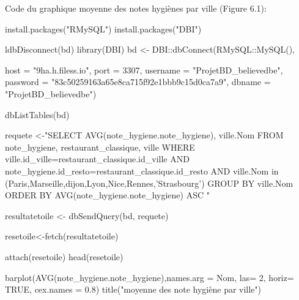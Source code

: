 \documentclass[mstat,12pt]{unswthesis}
\newenvironment{Shaded}{\begin{snugshade}}{\end{snugshade}}
\newcommand{\AttributeTok}[1]{\textcolor[rgb]{0.77,0.63,0.00}{#1}}
\newcommand{\ConstantTok}[1]{\textcolor[rgb]{0.00,0.00,0.00}{#1}}
\newcommand{\DecValTok}[1]{\textcolor[rgb]{0.00,0.00,0.81}{#1}}
\newcommand{\FloatTok}[1]{\textcolor[rgb]{0.00,0.00,0.81}{#1}}
\newcommand{\FunctionTok}[1]{\textcolor[rgb]{0.00,0.00,0.00}{#1}}
\newcommand{\NormalTok}[1]{#1}
\newcommand{\OtherTok}[1]{\textcolor[rgb]{0.56,0.35,0.01}{#1}}
\newcommand{\SpecialCharTok}[1]{\textcolor[rgb]{0.00,0.00,0.00}{#1}}
\newcommand{\StringTok}[1]{\textcolor[rgb]{0.31,0.60,0.02}{#1}}
\begin{document}
\normalsize
\bigskip

Code du graphique moyenne des notes hygiènes par ville (Figure 6.1):
\tiny

\begin{Shaded}
\begin{Highlighting}[]
\FunctionTok{install.packages}\NormalTok{(}\StringTok{"RMySQL"}\NormalTok{)}
\FunctionTok{install.packages}\NormalTok{(}\StringTok{"DBI"}\NormalTok{)}

\FunctionTok{ldbDisconnect}\NormalTok{(bd)}
\FunctionTok{library}\NormalTok{(DBI)}
\NormalTok{bd }\OtherTok{\textless{}{-}}\NormalTok{ DBI}\SpecialCharTok{::}\FunctionTok{dbConnect}\NormalTok{(RMySQL}\SpecialCharTok{::}\FunctionTok{MySQL}\NormalTok{(),}
                     
                     \AttributeTok{host =} \StringTok{"9ha.h.filess.io"}\NormalTok{, }\AttributeTok{port =} \DecValTok{3307}\NormalTok{,}
                     \AttributeTok{username =} \StringTok{"ProjetBD\_believedbe"}\NormalTok{,}
                     \AttributeTok{password =} \StringTok{"83c50259163a65e8ca715f92e1bbb9c15d0ca7a9"}\NormalTok{,}
                     \AttributeTok{dbname =} \StringTok{"ProjetBD\_believedbe"}\NormalTok{)}

\FunctionTok{dbListTables}\NormalTok{(bd)}

\NormalTok{requete }\OtherTok{\textless{}{-}}\StringTok{"SELECT AVG(note\_hygiene.note\_hygiene), ville.Nom }
\StringTok{  FROM note\_hygiene, restaurant\_classique, ville                }
\StringTok{  WHERE ville.id\_ville=restaurant\_classique.id\_ville}
\StringTok{  AND note\_hygiene.id\_resto=restaurant\_classique.id\_resto}
\StringTok{  AND ville.Nom in (\textquotesingle{}Paris\textquotesingle{},\textquotesingle{}Marseille\textquotesingle{},\textquotesingle{}dijon\textquotesingle{},\textquotesingle{}Lyon\textquotesingle{},\textquotesingle{}Nice\textquotesingle{},\textquotesingle{}Rennes\textquotesingle{},’Strasbourg’)}
\StringTok{  GROUP BY ville.Nom}
\StringTok{  ORDER BY AVG(note\_hygiene.note\_hygiene) ASC}
\StringTok{"}

\NormalTok{resultatetoile }\OtherTok{\textless{}{-}} \FunctionTok{dbSendQuery}\NormalTok{(bd, requete)}

\NormalTok{resetoile}\OtherTok{\textless{}{-}}\FunctionTok{fetch}\NormalTok{(resultatetoile)}

\FunctionTok{attach}\NormalTok{(resetoile)}
\FunctionTok{head}\NormalTok{(resetoile)}

\FunctionTok{barplot}\NormalTok{(}\StringTok{\textasciigrave{}}\AttributeTok{AVG(note\_hygiene.note\_hygiene)}\StringTok{\textasciigrave{}}\NormalTok{,}\AttributeTok{names.arg =}\NormalTok{ Nom, }\AttributeTok{las=} \DecValTok{2}\NormalTok{, }\AttributeTok{horiz=} \ConstantTok{TRUE}\NormalTok{, }\AttributeTok{cex.names =} \FloatTok{0.8}\NormalTok{)}
\FunctionTok{title}\NormalTok{(}\StringTok{"moyenne des note hygiène par ville"}\NormalTok{)}
\end{Highlighting}
\end{Shaded}
\end{document}
